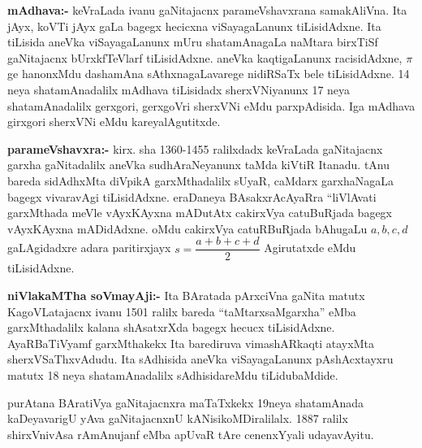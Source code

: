 \textbf{mAdhava:-} keVraLada ivanu gaNitajacnx parameVshavxrana samakAliVna. Ita jAyx, koVTi jAyx gaLa bagegx hecicxna viSayagaLanunx tiLisidAdxne. Ita tiLisida aneVka viSayagaLanunx mUru shatamAnagaLa naMtara birxTiSf gaNitajacnx bUrxkfTeVlarf tiLisidAdxne. aneVka kaqtigaLanunx racisidAdxne, $\pi$ ge hanonxMdu dashamAna sAthxnagaLavarege nidiRSaTx bele tiLisidAdxne. {\rm 14} neya shatamAnadalilx mAdhava tiLisidadx sherxVNiyanunx {\rm 17} neya shatamAnadalilx gerxgori, gerxgoVri sherxVNi eMdu parxpAdisida. Iga mAdhava girxgori sherxVNi eMdu kareyalAgutitxde.

\textbf{parameVshavxra:-} kirx. sha {\rm 1360-1455} ralilxdadx keVraLada gaNitajacnx garxha gaNitadalilx aneVka sudhAraNeyanunx taMda kiVtiR Itanadu. tAnu bareda sidAdhxMta diVpikA garxMthadalilx sUyaR, caMdarx garxhaNagaLa bagegx vivaravAgi tiLisidAdxne. eraDaneya BAsakxrAcAyaRra ``liVlAvati garxMthada meVle vAyxKAyxna mADutAtx cakirxVya catuBuRjada bagegx vAyxKAyxna mADidAdxne. oMdu cakirxVya catuRBuRjada bAhugaLu $a, b, c, d$ gaLAgidadxre adara paritirxjayx $s=\dfrac{a+b+c+d}{2}$ Agirutatxde eMdu tiLisidAdxne. 

\textbf{niVlakaMTha soVmayAji:-} Ita BAratada pArxciVna gaNita matutx KagoVLatajacnx ivanu {\rm 1501} ralilx bareda ``taMtarxsaMgarxha'' eMba garxMthadalilx kalana shAsatxrXda bagegx hecucx tiLisidAdxne. AyaRBaTiVyamf garxMthakekx Ita barediruva vimashARkaqti atayxMta sherxVSaThxvAdudu. Ita sAdhisida aneVka viSayagaLanunx pAshAcxtayxru matutx {\rm 18} neya shatamAnadalilx sAdhisidareMdu tiLidubaMdide.

purAtana BAratiVya gaNitajacnxra maTaTxkekx {\rm 19}neya shatamAnada kaDeyavarigU yAva gaNitajacnxnU kANisikoMDiralilalx. {\rm 1887} ralilx shirxVnivAsa rAmAnujanf eMba apUvaR tAre cenenxYyali udayavAyitu. 
